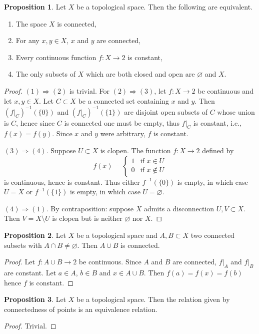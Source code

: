 \documentclass{book}
\theoremstyle{definition}
\newtheorem{proposition}{Proposition}[section]
\theoremstyle{remark}
\begin{document}
\begin{proposition}
Let $X$ be a topological space. Then the following are equivalent.
\begin{enumerate}
    \item The space $X$ is connected,
    \item For any $x,y\in X$, $x$ and $y$ are connected,
    \item Every continuous function $f:X\to 2$ is constant,
    \item The only subsets of $X$ which are both closed and open are $\varnothing$ and $X$.
\end{enumerate}
\end{proposition}
\begin{proof}
$(1)\Rightarrow(2)$ is trivial. For $(2)\Rightarrow(3)$, let $f:X\to 2$ be continuous and let $x,y\in X$. Let $C\subset X$ be a connected set containing $x$ and $y$. Then $(f|_C)^{-1}(\{0\})$ and $(f|_C)^{-1}(\{1\})$ are disjoint open subsets of $C$ whose union is $C$, hence since $C$ is connected one must be empty, thus $f|_C$ is constant, i.e., $f(x)=f(y)$. Since $x$ and $y$ were arbitrary, $f$ is constant.\par
$(3)\Rightarrow (4)$. Suppose $U\subset X$ is clopen. The function $f:X\to 2$ defined by
$$f(x)=\begin{cases}1 &\text{if }x\in U\\ 0&\text{if }x\notin U\end{cases}$$
is continuous, hence is constant. Thus either $f^{-1}(\{0\})$ is empty, in which case $U=X$ or $f^{-1}(\{1\})$ is empty, in which case $U=\varnothing$.\par

$(4)\Rightarrow(1)$. By contraposition: suppose $X$ admits a disconnection $U,V\subset X$. Then $V=X\setminus U$ is clopen but is neither $\varnothing$ nor $X$.
\end{proof}

\begin{proposition}
Let $X$ be a topological space and $A,B\subset X$ two connected subsets with $A\cap B\neq\varnothing$. Then $A\cup B$ is connected.
\end{proposition}
\begin{proof}
Let $f:A\cup B\to 2$ be continuous. Since $A$ and $B$ are connected, $f|_A$ and $f|_B$ are constant. Let $a\in A$, $b\in B$ and $x\in A\cup B$. Then $f(a)=f(x)=f(b)$ hence $f$ is constant.
\end{proof}

\begin{proposition}
Let $X$ be a topological space. Then the relation given by connectedness of points is an equivalence relation.
\end{proposition}
\begin{proof}
Trivial.
\end{proof}
\end{document}
